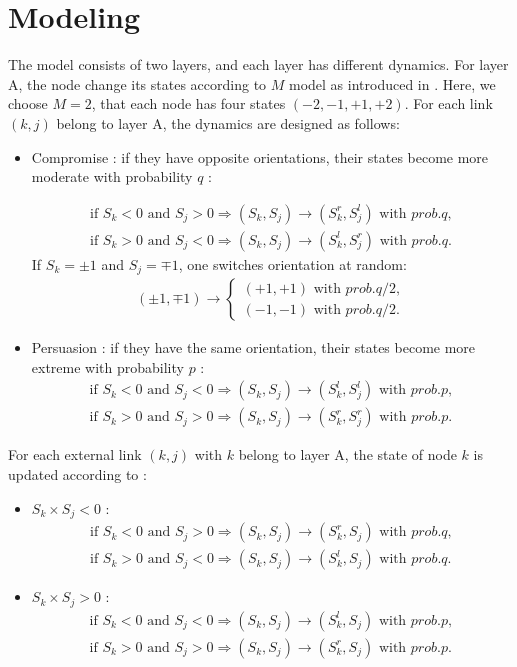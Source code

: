 \documentclass[english]{cccconf}
\begin{document}
\section{Modeling}
The model consists of two layers, and each layer has different dynamics. For layer A, the node change its states according to $M$ model as introduced in \cite{rocca2014}. Here, we choose $M=2$, that each node has four states $(-2, -1, +1, +2)$. For each link $(k, j)$ belong to layer A,  the dynamics are designed as follows:
\begin{itemize}
\item Compromise : if they have opposite orientations, their states become more moderate with probability $q$ :

\begin{align*}
\mbox{if } S_k<0 \mbox{ and } S_j>0  \Rightarrow (S_k, S_j) \rightarrow (S_k^r, S_j^l) \mbox{ with } prob.q,\\
\mbox{if } S_k>0 \mbox{ and } S_j<0  \Rightarrow (S_k, S_j) \rightarrow (S_k^l, S_j^r) \mbox{ with } prob.q.
\end{align*}
If $S_k = \pm1$ and $S_j = \mp1$, one switches orientation at random:
\begin{align*}
(\pm 1, \mp 1)\rightarrow \left\{\begin{matrix}
(+1, +1) \mbox{ with } prob.q/2,
\\(-1, -1)\mbox{ with } prob.q/2.
\end{matrix}\right.
\end{align*}
\item Persuasion : if they have the same orientation, their states become more extreme with probability $p$ :
\begin{align*}
\mbox{if } S_k<0 \mbox{ and } S_j<0  \Rightarrow (S_k, S_j) \rightarrow (S_k^l, S_j^l) \mbox{ with } prob.p,\\
\mbox{if } S_k>0 \mbox{ and } S_j>0  \Rightarrow (S_k, S_j) \rightarrow (S_k^r, S_j^r) \mbox{ with } prob.p.
\end{align*}
\end{itemize}
For each external link $(k,j)$ with $k$ belong to layer A, the state of node $k$ is updated according to :
\begin{itemize}
\item $S_k \times S_j < 0$ :
\begin{align*}
\mbox{if } S_k<0 \mbox{ and } S_j>0  \Rightarrow (S_k, S_j) \rightarrow (S_k^r, S_j) \mbox{ with } prob.q,\\
\mbox{if } S_k>0 \mbox{ and } S_j<0  \Rightarrow (S_k, S_j) \rightarrow (S_k^l, S_j) \mbox{ with } prob.q.
\end{align*}
\item $S_k \times S_j > 0$ :
\begin{align*}
\mbox{if } S_k<0 \mbox{ and } S_j<0  \Rightarrow (S_k, S_j) \rightarrow (S_k^l, S_j) \mbox{ with } prob.p,\\
\mbox{if } S_k>0 \mbox{ and } S_j>0  \Rightarrow (S_k, S_j) \rightarrow (S_k^r, S_j) \mbox{ with } prob.p.
\end{align*}
\end{itemize}
\end{document}
